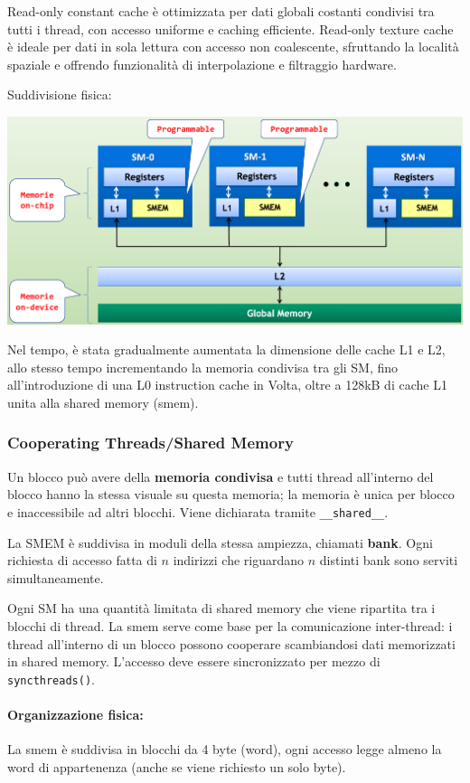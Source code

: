 Read-only constant cache è ottimizzata per dati globali costanti condivisi tra tutti i thread, con accesso uniforme e caching efficiente. Read-only texture cache è ideale per dati in sola lettura con accesso non coalescente, sfruttando la località spaziale e offrendo funzionalità di interpolazione e filtraggio hardware.

Suddivisione fisica:
\begin{center}
	\includegraphics[width=0.85\linewidth]{img/cuda/mem1}
\end{center}

Nel tempo, è stata gradualmente aumentata la dimensione delle cache L1 e L2, allo stesso tempo incrementando la memoria condivisa tra gli SM, fino all'introduzione di una L0 instruction cache in Volta, oltre a 128kB di cache L1 unita alla shared memory (smem).

\subsubsection{Cooperating Threads/Shared Memory}

Un blocco può avere della \textbf{memoria condivisa} e tutti thread all'interno del blocco hanno la stessa visuale su questa memoria; la memoria è unica per blocco e inaccessibile ad altri blocchi. Viene dichiarata tramite \texttt{\_\_shared\_\_}.

La SMEM è suddivisa in moduli della stessa ampiezza, chiamati \textbf{bank}. Ogni richiesta di accesso fatta di $n$ indirizzi che riguardano $n$ distinti bank sono serviti simultaneamente.

Ogni SM ha una quantità limitata di shared memory che viene ripartita tra i blocchi di thread. La smem serve come base per la comunicazione inter-thread: i thread all'interno di un blocco possono cooperare scambiandosi dati memorizzati in shared memory. L'accesso deve essere sincronizzato per mezzo di \texttt{syncthreads()}.

\paragraph{Organizzazione fisica:} La smem è suddivisa in blocchi da 4 byte (word), ogni accesso legge almeno la word di appartenenza (anche se viene richiesto un solo byte).

